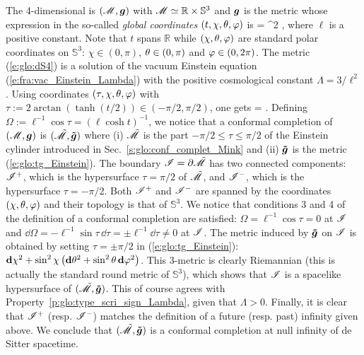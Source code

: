 \begin{example}
\label{x:glo:dS4}
The 4-dimensional  is
$(\mathscr{M},\bm{g})$ with $\mathscr{M}\simeq \mathbb{R}\times\mathbb{S}^3$ and $\bm{g}$ is the metric
whose expression in the so-called \emph{global coordinates}
$(t,\chi,\theta,\varphi)$ is
\be \label{e:glo:dS4}
     = \ell^2  ,
\ee
where $\ell$ is a positive constant. Note that $t$ spans $\mathbb{R}$
while $(\chi,\theta,\varphi)$ are standard polar coordinates on $\mathbb{S}^3$:
$\chi\in(0,\pi)$, $\theta\in(0,\pi)$ and $\varphi\in(0,2\pi)$.
 The metric (\ref{e:glo:dS4}) is a solution
of the vacuum Einstein equation (\ref{e:fra:vac_Einstein_Lambda}) with
the positive cosmological constant $\Lambda = 3/\ell^2$.
Using coordinates $(\tau,\chi,\theta,\varphi)$ with
$\tau := 2\arctan(\tanh(t/2)) \in (-\pi/2,\pi/2)$, one gets
\be
     =   .
\ee
Defining $\Omega := \ell^{-1}\cos\tau = (\ell\cosh t)^{-1}$, we notice that
a conformal completion of $(\mathscr{M},\bm{g})$ is $(\tilde{\mathscr{M}},\bm{\tilde{g}})$
where (i) $\tilde{\mathscr{M}}$ is the part $-\pi/2\leq \tau \leq \pi/2$ of the Einstein cylinder
introduced in Sec.~\ref{s:glo:conf_complet_Mink}
and (ii)  $\bm{\tilde{g}}$ is the metric (\ref{e:glo:tg_Einstein}).
The boundary $\mathscr{I} = \partial\tilde{\mathscr{M}}$ has two connected components:
$\mathscr{I}^+$, which is the hypersurface $\tau = \pi/2$ of $\tilde{\mathscr{M}}$, and
$\mathscr{I}^-$, which is the hypersurface $\tau = -\pi/2$.
Both $\mathscr{I}^+$ and $\mathscr{I}^-$ are spanned by the coordinates $(\chi,\theta,\varphi)$
and their topology is that of $\mathbb{S}^3$.
We notice that conditions 3 and 4 of the definition of a conformal completion
are satisfied: $\Omega = \ell^{-1} \cos\tau = 0$ at $\mathscr{I}$ and
$\dd\Omega = - \ell^{-1} \sin\tau\, \dd\tau = \pm \ell^{-1} \dd\tau \not = 0 $
at $\mathscr{I}$.
The metric induced by $\bm{\tilde{g}}$ on $\mathscr{I}$ is obtained by
setting $\tau=\pm\pi/2$ in (\ref{e:glo:tg_Einstein}):
$\mathbf{d} \chi^2 + \sin^2\chi \left( \mathbf{d}\theta^2 + \sin^2\theta \, \mathbf{d}\varphi^2 \right) $.
This 3-metric is clearly Riemannian (this is actually the standard round metric
of $\mathbb{S}^3$), which shows that $\mathscr{I}$ is a spacelike
hypersurface of $(\tilde{\mathscr{M}},\bm{\tilde{g}})$. This of course agrees with
Property~\ref{p:glo:type_scri_sign_Lambda}, given that $\Lambda > 0$.
Finally, it is clear that $\mathscr{I}^+$ (resp. $\mathscr{I}^-$)
matches the definition of a future (resp. past) infinity given above.
We conclude that $(\tilde{\mathscr{M}},\bm{\tilde{g}})$ is a conformal completion at null infinity
of de Sitter spacetime.
\end{example}

